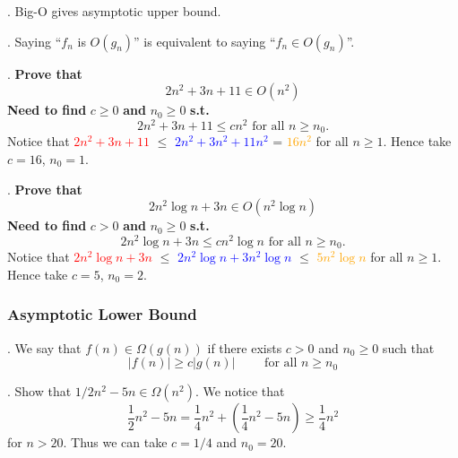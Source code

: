 \documentclass{article}
\begin{document}
\begin{result}[].
    Big-O gives asymptotic upper bound. 
\end{result}

\begin{comm}[].
    Saying ``$f_n$ is $O(g_n)$'' is equivalent to saying ``$f_n \in O(g_n)$''. 
\end{comm}

\begin{examplee}[].
    \textbf{Prove that}
    \[ 2n^2 + 3n + 11 \in O(n^2) \]
    \textbf{Need to find} $c \geq 0$ \textbf{and} $n_0 \geq 0$ \textbf{s.t.}
    \[ 2n^2 + 3n + 11 \leq cn^2 \text{ for all } n \geq n_0. \]
    Notice that \textcolor{red}{\textbf{$2n^2 + 3n + 11$}} $\leq$ \textcolor{blue}{$2n^2 + 3n^2 + 11n^2$} = \textcolor{orange}{$16n^2$} for all $n \geq 1$. Hence take $c = 16$, $n_0 = 1$. 
\end{examplee}

\begin{examplee}[].
    \textbf{Prove that}
    \[ 2n^2 \log n + 3n \in O(n^2 \log n) \]
    \textbf{Need to find} $ c > 0 $ \textbf{and} $ n_0 \geq 0 $ \textbf{s.t.}
    \[ 2n^2 \log n + 3n \leq c n^2 \log n \text{ for all } n \geq n_0. \]
    Notice that \textcolor{red}{$2n^2 \log n + 3n$} $\leq$ \textcolor{blue}{$2n^2 \log n + 3n^2 \log n$} $\leq$ \textcolor{orange}{$5n^2 \log n$} for all $n \geq 1$. Hence take $c = 5$, $n_0 = 2$. 
\end{examplee}

\begin{center}
\end{center}

\subsubsection{Asymptotic Lower Bound}

\begin{deff}.
    We say that $f(n) \in \Omega(g(n))$ if there exists $c > 0$ and $n_0 \geq 0$ such that 
    \[ |f(n)| \geq c |g(n)| \qquad \text{ for all } n \geq n_0 \] 
\end{deff}

\begin{examplee}[].
    Show that $1/2 n^2 - 5n \in \Omega(n^2)$. We notice that 
    \[ 
        \frac{1}{2} n^2 - 5n = \frac{1}{4} n^2 + \left( \frac{1}{4} n^2 - 5n \right) \geq \frac{1}{4} n^2
    \]
    for $n > 20$. Thus we can take $c = 1/4$ and $n_0 = 20$.  
\end{examplee}
\end{document}
